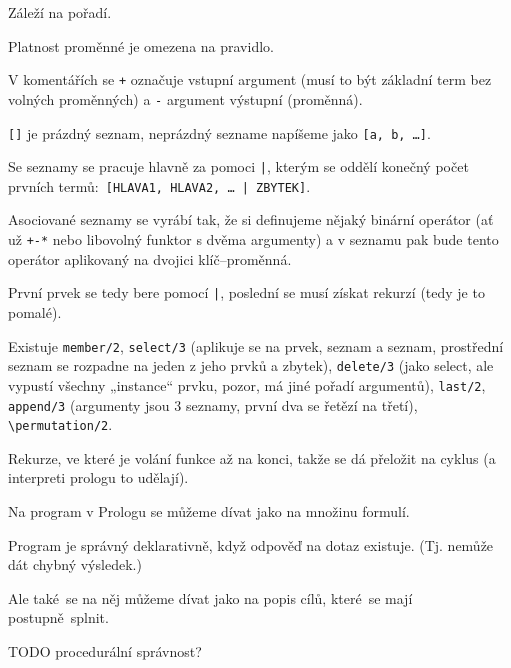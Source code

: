 \documentclass[12pt]{article}					%
\begin{document}
\begin{upozorneni}
	Záleží na pořadí.

	Platnost proměnné je omezena na pravidlo.
\end{upozorneni}

\begin{poznamka}
	V komentářích se \verb|+| označuje vstupní argument (musí to být základní term bez volných proměnných) a \verb|-| argument výstupní (proměnná).
\end{poznamka}

\begin{definice}[Seznam]
	\verb|[]| je prázdný seznam, neprázdný sezname napíšeme jako \verb|[a, b, …]|.

	Se seznamy se pracuje hlavně za pomoci \verb$|$, kterým se oddělí konečný počet prvních termů: \verb$[HLAVA1, HLAVA2, … | ZBYTEK]$.

	Asociované seznamy se vyrábí tak, že si definujeme nějaký binární operátor (ať už \verb|+-*| nebo libovolný funktor s dvěma argumenty) a v seznamu pak bude tento operátor aplikovaný na dvojici klíč–proměnná.

	První prvek se tedy bere pomocí \verb$|$, poslední se musí získat rekurzí (tedy je to pomalé).

	Existuje \verb|member/2|, \verb|select/3| (aplikuje se na prvek, seznam a seznam, prostřední seznam se rozpadne na jeden z jeho prvků a zbytek), \verb|delete/3| (jako select, ale vypustí všechny „instance“ prvku, pozor, má jiné pořadí argumentů), \verb|last/2|, \verb|append/3| (argumenty jsou 3 seznamy, první dva se řetězí na třetí), \verb|\permutation/2|.
\end{definice}


\begin{definice}
	Rekurze, ve které je volání funkce až na konci, takže se dá přeložit na cyklus (a interpreti prologu to udělají).
\end{definice}

\begin{definice}
	Na program v Prologu se můžeme dívat jako na množinu formulí.

	Program je správný deklarativně, když odpověď na dotaz existuje. (Tj. nemůže dát chybný výsledek.)
\end{definice}

\begin{definice}
	Ale také se na něj můžeme dívat jako na popis cílů, které se mají postupně splnit.

	TODO procedurální správnost?
\end{definice}
\end{document}
